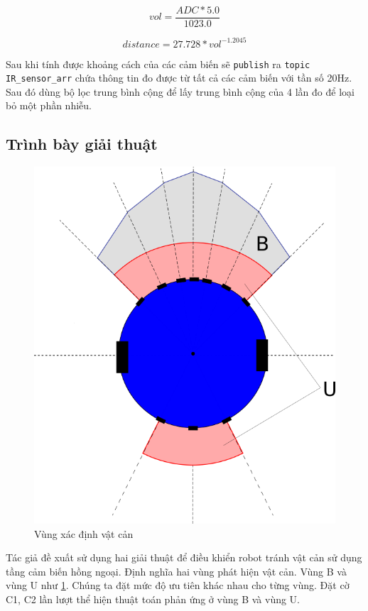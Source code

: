 \begin{equation}
    vol = \frac{ADC * 5.0}{1023.0}
\end{equation}

\begin{equation}
    distance = 27.728 * {vol}^{-1.2045}
\end{equation}

Sau khi tính được khoảng cách của các cảm biến sẽ {\tt publish} ra {\tt topic IR\_sensor\_arr} chứa thông tin đo được từ tất cả các cảm biến với tần số 20Hz.
Sau đó dùng bộ lọc trung bình cộng để lấy trung bình cộng của 4 lần đo để loại bỏ một phần nhiễu.

\subsection{Trình bày giải thuật}

\begin{figure}[htbp]
    \centering
    \includegraphics[width=0.5\linewidth]{figures/arg_obstacle-detection-area.png}
    \caption{Vùng xác định vật cản}
    \label{fig:arg-obstacle-area}
\end{figure}

Tác giả đề xuất sử dụng hai giải thuật để điều khiển robot tránh vật cản sử dụng tầng cảm biến hồng ngoại. Định nghĩa hai vùng phát hiện vật cản. Vùng B và vùng U như \figurename{\ref{fig:arg-obstacle-area}}. Chúng ta đặt mức độ ưu tiên khác nhau cho từng vùng. Đặt cờ C1, C2 lần lượt thể hiện thuật toán phản ứng ở vùng B và vùng U.

